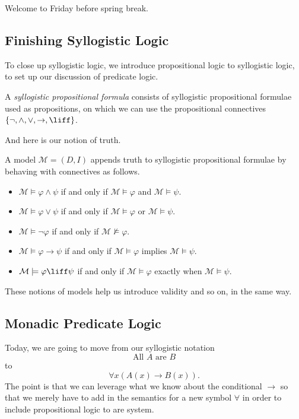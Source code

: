 
Welcome to Friday before spring break.

\subsection{Finishing Syllogistic Logic}
To close up syllogistic logic, we introduce propositional logic to syllogistic logic, to set up our discussion of predicate logic.
\begin{definition}
	A \textit{syllogistic propositional formula} consists of syllogistic propositional formulae used as propositions, on which we can use the propositional connectives $\{\lnot,\land,\lor,\to,\liff\}$.
\end{definition}
And here is our notion of truth.
\begin{definition}[Model]
	A model $\mathcal M=(D,I)$ appends truth to syllogistic propositional formulae by behaving with connectives as follows.
	\begin{itemize}
		\item $\mathcal M\models\varphi\land\psi$ if and only if $\mathcal M\models\varphi$ and $\mathcal M\models\psi$.
		\item $\mathcal M\models\varphi\lor\psi$ if and only if $\mathcal M\models\varphi$ or $\mathcal M\models\psi$.
		\item $\mathcal M\models\lnot\varphi$ if and only if $\mathcal M\nvDash\varphi$.
		\item $\mathcal M\models\varphi\to\psi$ if and only if $\mathcal M\models\varphi$ implies $\mathcal M\models\psi$.
		\item $\mathcal M\models\varphi\liff\psi$ if and only if $\mathcal M\models\varphi$ exactly when $\mathcal M\models\psi$.
	\end{itemize}
\end{definition}
These notions of models help us introduce validity and so on, in the same way.

\subsection{Monadic Predicate Logic}
Today, we are going to move from our syllogistic notation
\[\textrm{All $A$ are $B$}\]
to
\[\forall x(A(x)\to B(x)).\]
The point is that we can leverage what we know about the conditional $\to$ so that we merely have to add in the semantics for a new symbol $\forall$ in order to include propositional logic to are system.

